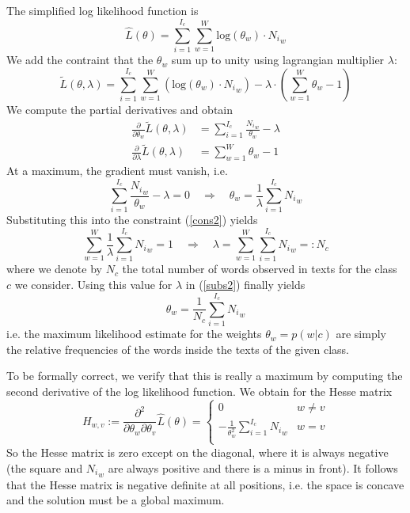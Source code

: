 \documentclass[%
   11pt,              %
   ngerman,           %
   a4paper,           %
   DIV11,             %
]{scrartcl}%
\begin{document}
The simplified log likelihood function is
\begin{equation*}
	\hat{L}(\theta) = \sum_{i=1}^{I_c} \sum_{w=1}^W \text{log}(\theta_w) \cdot {N_i}_w
\end{equation*}
We add the contraint that the $\theta_w$ sum up to unity using lagrangian multiplier $\lambda$:
\begin{equation*}
	\tilde{L}(\theta, \lambda) = \sum_{i=1}^{I_c} \sum_{w=1}^W (\text{log}(\theta_w) \cdot {N_i}_w) - \lambda \cdot (\sum_{w=1}^W \theta_w - 1)
\end{equation*}
We compute the partial derivatives and obtain
\begin{align*}
	\frac{\partial}{\partial \theta_w} \tilde{L}(\theta, \lambda) &=  \sum_{i=1}^{I_c} \frac{{N_i}_w}{\theta_w} - \lambda\\
	\frac{\partial}{\partial \lambda} \tilde{L}(\theta, \lambda) &= \sum_{w=1}^W \theta_w - 1
\end{align*}
At a maximum, the gradient must vanish, i.e.
\begin{equation}\label{subs2}
	\sum_{i=1}^{I_c} \frac{{N_i}_w}{\theta_w} - \lambda = 0 \quad \Rightarrow \quad \theta_w = \frac{1}{\lambda} \sum_{i=1}^{I_c} {N_i}_w
\end{equation}
Substituting this into the constraint (\ref{cons2}) yields
\begin{equation*}
	\sum_{w=1}^W \frac{1}{\lambda} \sum_{i=1}^{I_c} {N_i}_w = 1 \quad \Rightarrow \quad \lambda = \sum_{w=1}^W \sum_{i=1}^{I_c} {N_i}_w =: N_c
\end{equation*}
where we denote by $N_c$ the total number of words observed in texts for the class $c$ we consider. Using this value for $\lambda$ in (\ref{subs2}) finally yields
\begin{equation*}
	\theta_w = \frac{1}{N_c} \sum_{i=1}^{I_c} {N_i}_w
\end{equation*}
i.e. the maximum likelihood estimate for the weights $\theta_w = p(w|c)$ are simply the relative frequencies of the words inside the texts of the given class. \par
To be formally correct, we verify that this is really a maximum by computing the second derivative of the log likelihood function. We obtain for the Hesse matrix
\begin{equation*}
	H_{w,v} := \frac{\partial^2}{\partial \theta_w \partial \theta_v} \hat{L}(\theta) = \begin{cases}
	0 & w \neq v \\
	- \frac{1}{\theta_w^2} \sum_{i=1}^{I_c} {N_i}_w & w = v \\ \end{cases}
\end{equation*}
So the Hesse matrix is zero except on the diagonal, where it is always negative (the square and ${N_i}_w$ are always positive and there is a minus in front). It follows that the Hesse matrix is negative definite at all positions, i.e. the space is concave and the solution must be a global maximum.
\end{document}
